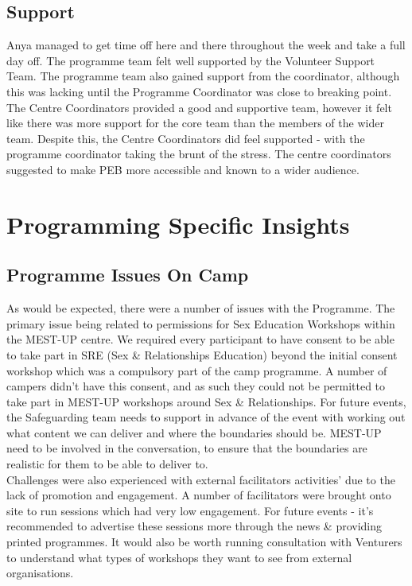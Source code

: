 \subsection{Support}
Anya managed to get time off here and there throughout the week and take a full day off. The programme team felt well supported by the Volunteer Support Team. The programme team also gained support from the coordinator, although this was lacking until the Programme Coordinator was close to breaking point. The Centre Coordinators provided a good and supportive team, however it felt like there was more support for the core team than the members of the wider team. Despite this, the Centre Coordinators did feel supported - with the programme coordinator taking the brunt of the stress. The centre coordinators suggested to make PEB more accessible and known to a wider audience.

\section{Programming Specific Insights}
\subsection{Programme Issues On Camp}
As would be expected, there were a number of issues with the Programme. The primary issue being related to permissions for Sex Education Workshops within the MEST-UP centre. We required every participant to have consent to be able to take part in SRE (Sex \& Relationships Education) beyond the initial consent workshop which was a compulsory part of the camp programme. A number of campers didn't have this consent, and as such they could not be permitted to take part in MEST-UP workshops around Sex \& Relationships. For future events, the Safeguarding team needs to support in advance of the event with working out what content we can deliver and where the boundaries should be. MEST-UP need to be involved in the conversation, to ensure that the boundaries are realistic for them to be able to deliver to.\\

Challenges were also experienced with external facilitators activities' due to the lack of promotion and engagement. A number of facilitators were brought onto site to run sessions which had very low engagement. For future events - it's recommended to advertise these sessions more through the news \& providing printed programmes. It would also be worth running consultation with Venturers to understand what types of workshops they want to see from external organisations.\\

